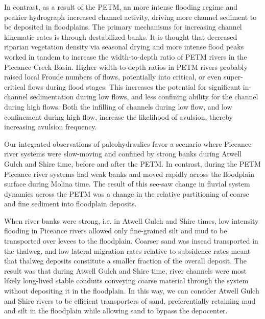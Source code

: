\documentclass[draft]{compact_proposal}
\begin{document}
In contrast, as a result of the PETM, an more intense flooding regime and peakier hydrograph increased channel activity, driving more channel sediment to be deposited in floodplains.
The primary mechanisms for increasing channel kinematic rates is through destabilized banks.
It is thought that decreased riparian vegetation density via seasonal drying and more intense flood peaks worked in tandem to increase the width-to-depth ratio of PETM rivers in the Piceance Creek Basin.
Higher width-to-depth ratios in PETM rivers probably raised local Froude numbers of flows, potentially into critical, or even super-critical flows during flood stages.
This increases the potential for significant in-channel sedimentation during low flows, and less confining ability for the channel during high flows.
Both the infilling of channels during low flow, and low confinement during high flow, increase the likelihood of avulsion, thereby increasing avulsion frequency.

Our integrated observations of paleohydraulics favor a scenario where Piceance river systems were slow-moving and confined by strong banks during Atwell Gulch and Shire time, before and after the PETM.
In contrast, during the PETM Piceance river systems had weak banks and moved rapidly across the floodplain surface during Molina time.
The result of this see-saw change in fluvial system dynamics across the PETM was a change in the relative partitioning of coarse and fine sediment into floodplain deposits.

When river banks were strong, i.e. in Atwell Gulch and Shire times, low intensity flooding in Piceance rivers allowed only fine-grained silt and mud to be transported over levees to the floodplain.
Coarser sand was insead transported in the thalweg, and low lateral migration rates relative to subsidence rates meant that thalweg deposits constitute a smaller fraction of the overall deposit.
The result was that during Atwell Gulch and Shire time, river channels were most likely long-lived stable conduits conveying coarse material through the system without depositing it in the floodplain.
In this way, we can consider Atwell Gulch and Shire rivers to be efficient transporters of sand, preferentially retaining mud and silt in the floodplain while allowing sand to bypass the depocenter.
\end{document}

